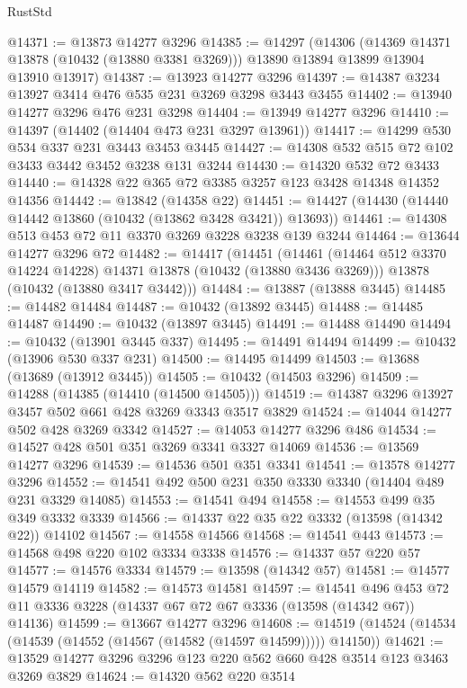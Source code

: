 \begin{lexlean}{RustStd}
\begin{coremodule}
@14371 := @13873 @14277 @3296
@14385 := @14297
    (@14306
      (@14369 @14371 @13878 (@10432 (@13880 @3381 @3269)))
      @13890
      @13894
      @13899
      @13904
      @13910
      @13917)
@14387 := @13923 @14277 @3296
@14397 := @14387 @3234 @13927 @3414 @476 @535 @231 @3269 @3298 @3443 @3455
@14402 := @13940 @14277 @3296 @476 @231 @3298
@14404 := @13949 @14277 @3296
@14410 := @14397 (@14402 (@14404 @473 @231 @3297 @13961))
@14417 := @14299 @530 @534 @337 @231 @3443 @3453 @3445
@14427 := @14308 @532 @515 @72 @102 @3433 @3442 @3452 @3238 @131 @3244
@14430 := @14320 @532 @72 @3433
@14440 := @14328 @22 @365 @72 @3385 @3257 @123 @3428 @14348 @14352 @14356
@14442 := @13842 (@14358 @22)
@14451 := @14427 (@14430 (@14440 @14442 @13860 (@10432 (@13862 @3428 @3421)) @13693))
@14461 := @14308 @513 @453 @72 @11 @3370 @3269 @3228 @3238 @139 @3244
@14464 := @13644 @14277 @3296 @72
@14482 := @14417
    (@14451
      (@14461 (@14464 @512 @3370 @14224 @14228) @14371 @13878 (@10432 (@13880 @3436 @3269)))
      @13878
      (@10432 (@13880 @3417 @3442)))
@14484 := @13887 (@13888 @3445)
@14485 := @14482 @14484
@14487 := @10432 (@13892 @3445)
@14488 := @14485 @14487
@14490 := @10432 (@13897 @3445)
@14491 := @14488 @14490
@14494 := @10432 (@13901 @3445 @337)
@14495 := @14491 @14494
@14499 := @10432 (@13906 @530 @337 @231)
@14500 := @14495 @14499
@14503 := @13688 (@13689 (@13912 @3445))
@14505 := @10432 (@14503 @3296)
@14509 := @14288 (@14385 (@14410 (@14500 @14505)))
@14519 := @14387 @3296 @13927 @3457 @502 @661 @428 @3269 @3343 @3517 @3829
@14524 := @14044 @14277 @502 @428 @3269 @3342
@14527 := @14053 @14277 @3296 @486
@14534 := @14527 @428 @501 @351 @3269 @3341 @3327 @14069
@14536 := @13569 @14277 @3296
@14539 := @14536 @501 @351 @3341
@14541 := @13578 @14277 @3296
@14552 := @14541 @492 @500 @231 @350 @3330 @3340 (@14404 @489 @231 @3329 @14085)
@14553 := @14541 @494
@14558 := @14553 @499 @35 @349 @3332 @3339
@14566 := @14337 @22 @35 @22 @3332 (@13598 (@14342 @22)) @14102
@14567 := @14558 @14566
@14568 := @14541 @443
@14573 := @14568 @498 @220 @102 @3334 @3338
@14576 := @14337 @57 @220 @57
@14577 := @14576 @3334
@14579 := @13598 (@14342 @57)
@14581 := @14577 @14579 @14119
@14582 := @14573 @14581
@14597 := @14541
    @496
    @453
    @72
    @11
    @3336
    @3228
    (@14337 @67 @72 @67 @3336 (@13598 (@14342 @67)) @14136)
@14599 := @13667 @14277 @3296
@14608 := @14519 (@14524 (@14534 (@14539 (@14552 (@14567 (@14582 (@14597 @14599))))) @14150))
@14621 := @13529 @14277 @3296 @3296 @123 @220 @562 @660 @428 @3514 @123 @3463 @3269 @3829
@14624 := @14320 @562 @220 @3514

\end{coremodule}
\end{lexlean}
